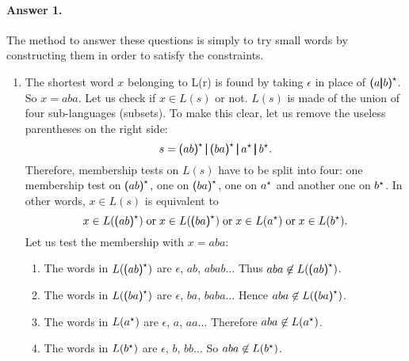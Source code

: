 \paragraph{Answer 1.}

The method to answer these questions is simply to try small words by
constructing them in order to satisfy the constraints.
\begin{enumerate}

  \item The \label{aba} shortest word \(x\) belonging to L(r) is found
    by taking \(\epsilon\) in place of \(\textsf{(} a \pmb{\lvert}{}
    b\textsf{)}^{\star}\). So \(x = aba\). Let us check if \(x \in L(s)\)
    or not. \(L(s)\) is made of the union of four sub-languages
    (subsets). To make this clear, let us remove the useless
    parentheses on the right side:
    \begin{equation*}
    s = \textsf{(} ab \textsf{)}^{\star}{} \, \pmb{\lvert}{} \, \textsf{(} ba
    \textsf{)}^{\star}{} \, \pmb{\lvert}{} \, a^{\star}{} \, \pmb{\lvert}{} \,
    b^{\star}.
    \end{equation*}
    Therefore, membership tests on \(L(s)\) have to be split
    into four: one membership test on \(\textsf{(} ab
    \textsf{)}^{\star}\), one on \(\textsf{(} ba \textsf{)}^{\star}\),
    one on \(a^{\star}\) and another one on
    \(b^{\star}\). In other words, \(x \in L(s)\) is equivalent to
    \begin{equation*}
    x \in L(\textsf{(} ab \textsf{)}^{\star}) \;
     \text{or} \; x \in L(\textsf{(} ba \textsf{)}^{\star}) \;
     \text{or} \; x \in L(a^{\star}) \; \text{or} \; x
     \in L(b^{\star}).
    \end{equation*}
    Let us test the membership with \(x = aba\):
    \begin{enumerate}
  
      \item The words in \(L(\textsf{(} ab \textsf{)}^{\star})\) are
        \(\epsilon\), \(ab\), \(abab\ldots\) Thus \(aba \not\in
        L(\textsf{(} ab \textsf{)}^{\star})\).

      \item The words in \(L(\textsf{(} ba \textsf{)}^{\star})\) are
        \(\epsilon\), \(ba\), \(baba\ldots\) Hence \(aba \not\in
        L(\textsf{(} ba \textsf{)}^{\star})\).

      \item The words in \(L(a^{\star})\) are \(\epsilon\), \(a\),
        \(aa\ldots\) Therefore \(aba \not\in L(a^{\star})\).

      \item The words in \(L(b^{\star})\) are \(\epsilon\), \(b\),
        \(bb\ldots\) So \(aba \not\in L(b^{\star})\).
  

\end{enumerate}
\end{enumerate}
